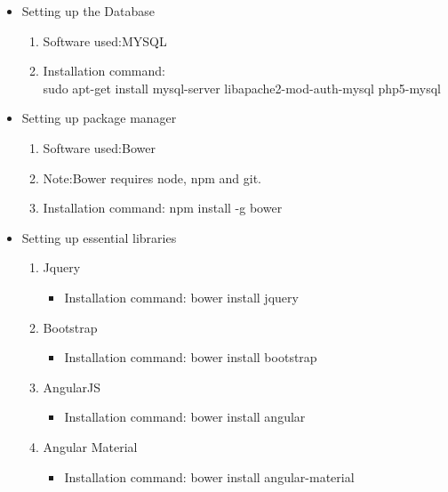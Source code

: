 \documentclass[a4paper,12pt,oneside]{book}
\begin{document}
\begin{enumerate}
\begin{itemize}
\begin{enumerate}
                \end{enumerate}
            \item Setting up the Database
                \begin{enumerate}
                    \item Software used:MYSQL
                    \item Installation command: \\sudo apt-get install mysql-server libapache2-mod-auth-mysql php5-mysql
                \end{enumerate}
            \item{Setting up package manager}
                \begin{enumerate}
                    \item{Software used:Bower}
                    \item{Note:Bower requires node, npm and git.}
                    \item {Installation command: npm install -g bower}
                \end{enumerate}
            \item{Setting up essential libraries}
                \begin{enumerate}
                    \item{Jquery}
                        \begin{itemize}
                            \item{Installation command: bower install jquery}
                        \end{itemize}
                    \item{Bootstrap}
                        \begin{itemize}
                            \item{Installation command: bower install bootstrap}
                        \end{itemize}
                    \item{AngularJS}
                        \begin{itemize}
                            \item{Installation command: bower install angular}
                        \end{itemize}
                    \item{Angular Material}
                        \begin{itemize}
                            \item{Installation command: bower install angular-material}

\end{itemize}
\end{enumerate}
\end{itemize}
\end{enumerate}
\end{document}
